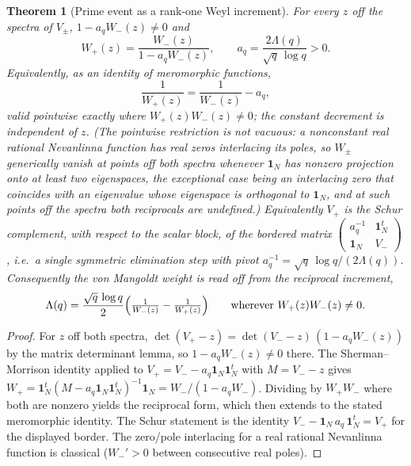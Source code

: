 \documentclass[11pt]{article}
\theoremstyle{plain}
\newtheorem{theorem}{Theorem}[section]
\theoremstyle{definition}
\theoremstyle{remark}
\newcommand{\one}{\mathbf 1}
\newcommand{\Lam}{\Lambda}
\begin{document}
\begin{theorem}[Prime event as a rank-one Weyl increment]\label{thm:krein}
For every $z$ off the spectra of $V_\pm$, $1-a_qW_-(z)\ne0$ and
\[
        W_+(z)=\frac{W_-(z)}{1-a_qW_-(z)},
        \qquad a_q=\frac{2\Lam(q)}{\sqrt q\,\log q}>0 .
\]
Equivalently, as an identity of meromorphic functions,
\[
        \frac{1}{W_+(z)}=\frac{1}{W_-(z)}-a_q,
\]
valid pointwise exactly where $W_+(z)W_-(z)\ne0$; the constant decrement is
\emph{independent of $z$}. (The pointwise restriction is not vacuous: a
nonconstant real rational Nevanlinna function has real zeros interlacing its
poles, so $W_\pm$ generically vanish at points off both spectra whenever
$\one_N$ has
nonzero projection onto at least two eigenspaces, the exceptional case being an
interlacing zero that coincides with an eigenvalue whose eigenspace is
orthogonal to $\one_N$, and at such points off the spectra both
reciprocals are undefined.) Equivalently $V_+$ is the Schur complement, with
respect to the scalar block, of the bordered matrix
$\left(\begin{smallmatrix}a_q^{-1}&\one_N^t\\ \one_N&V_-\end{smallmatrix}\right)$,
i.e.\ a single symmetric elimination step with pivot $a_q^{-1}=\sqrt q\,\log q/
(2\Lam(q))$. Consequently the von Mangoldt weight is read off from the
reciprocal increment,
\[
        \Lam(q)=\frac{\sqrt q\,\log q}{2}\Bigl(\tfrac{1}{W_-(z)}-\tfrac{1}{W_+(z)}\Bigr)
        \qquad\text{wherever }W_+(z)W_-(z)\ne0 .
\]
\end{theorem}

\begin{proof}
For $z$ off both spectra,
$\det(V_+-z)=\det(V_--z)\,(1-a_qW_-(z))$ by the matrix determinant lemma, so
$1-a_qW_-(z)\ne0$ there. The Sherman--Morrison identity applied to
$V_+=V_--a_q\one_N\one_N^t$ with
$M=V_--z$ gives
$W_+=\one_N^t(M-a_q\one_N\one_N^t)^{-1}\one_N=W_-/(1-a_qW_-)$. Dividing by
$W_+W_-$ where both are nonzero yields the reciprocal form, which then extends
to the stated meromorphic identity. The Schur statement is the identity
$V_--\one_N\,a_q\,\one_N^t=V_+$ for the displayed border. The zero/pole
interlacing for a real rational Nevanlinna function is classical
\cite{KacKrein1974R}
($W_-'>0$ between consecutive real poles).
\end{proof}
\end{document}
